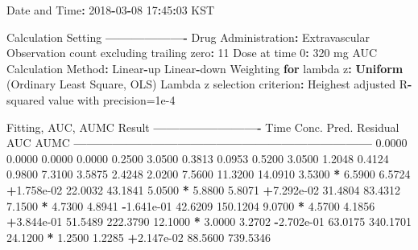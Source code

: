 \documentclass[12pt,]{krantz}
\newenvironment{Shaded}{\begin{snugshade}}{\end{snugshade}}
\newcommand{\KeywordTok}[1]{\textcolor[rgb]{0.13,0.29,0.53}{\textbf{#1}}}
\newcommand{\DecValTok}[1]{\textcolor[rgb]{0.00,0.00,0.81}{#1}}
\newcommand{\FloatTok}[1]{\textcolor[rgb]{0.00,0.00,0.81}{#1}}
\newcommand{\StringTok}[1]{\textcolor[rgb]{0.31,0.60,0.02}{#1}}
\newcommand{\ControlFlowTok}[1]{\textcolor[rgb]{0.13,0.29,0.53}{\textbf{#1}}}
\newcommand{\OperatorTok}[1]{\textcolor[rgb]{0.81,0.36,0.00}{\textbf{#1}}}
\newcommand{\NormalTok}[1]{#1}
\theoremstyle{definition}
\theoremstyle{definition}
\theoremstyle{definition}
\theoremstyle{remark}
\begin{document}
\begin{Shaded}
\begin{Highlighting}[]
{{{{{{{{\NormalTok{Date and Time}\OperatorTok{:}\StringTok{ }\DecValTok{2018}\OperatorTok{-}\DecValTok{03}\OperatorTok{-}\DecValTok{08} \DecValTok{17}\OperatorTok{:}\DecValTok{45}\OperatorTok{:}\DecValTok{03}\NormalTok{ KST}

\NormalTok{Calculation Setting}
\OperatorTok{-------------------}
\NormalTok{Drug Administration}\OperatorTok{:}\StringTok{ }\NormalTok{Extravascular}
\NormalTok{Observation count excluding trailing zero}\OperatorTok{:}\StringTok{ }\DecValTok{11}
\NormalTok{Dose at time }\DecValTok{0}\OperatorTok{:}\StringTok{ }\DecValTok{320}\NormalTok{ mg}
\NormalTok{AUC Calculation Method}\OperatorTok{:}\StringTok{ }\NormalTok{Linear}\OperatorTok{-}\NormalTok{up Linear}\OperatorTok{-}\NormalTok{down}
\NormalTok{Weighting }\ControlFlowTok{for}\NormalTok{ lambda z}\OperatorTok{:}\StringTok{ }\KeywordTok{Uniform}\NormalTok{ (Ordinary Least Square, OLS)}
\NormalTok{Lambda z selection criterion}\OperatorTok{:}\StringTok{ }\NormalTok{Heighest adjusted R}\OperatorTok{-}\NormalTok{squared value with precision=}\FloatTok{1e-4}


\NormalTok{Fitting, AUC, AUMC Result}
\OperatorTok{-------------------------}
\StringTok{      }\NormalTok{Time         Conc.      Pred.   Residual       AUC       AUMC}
\OperatorTok{---------------------------------------------------------------------}
\StringTok{     }\FloatTok{0.0000}       \FloatTok{0.0000}                           \FloatTok{0.0000}     \FloatTok{0.0000}
     \FloatTok{0.2500}       \FloatTok{3.0500}                           \FloatTok{0.3813}     \FloatTok{0.0953}
     \FloatTok{0.5200}       \FloatTok{3.0500}                           \FloatTok{1.2048}     \FloatTok{0.4124}
     \FloatTok{0.9800}       \FloatTok{7.3100}                           \FloatTok{3.5875}     \FloatTok{2.4248}
     \FloatTok{2.0200}       \FloatTok{7.5600}                          \FloatTok{11.3200}    \FloatTok{14.0910}
     \FloatTok{3.5300} \OperatorTok{*}\StringTok{     }\FloatTok{6.5900}     \FloatTok{6.5724} \OperatorTok{+}\FloatTok{1.758e-02}    \FloatTok{22.0032}    \FloatTok{43.1841}
     \FloatTok{5.0500} \OperatorTok{*}\StringTok{     }\FloatTok{5.8800}     \FloatTok{5.8071} \OperatorTok{+}\FloatTok{7.292e-02}    \FloatTok{31.4804}    \FloatTok{83.4312}
     \FloatTok{7.1500} \OperatorTok{*}\StringTok{     }\FloatTok{4.7300}     \FloatTok{4.8941} \OperatorTok{-}\FloatTok{1.641e-01}    \FloatTok{42.6209}   \FloatTok{150.1204}
     \FloatTok{9.0700} \OperatorTok{*}\StringTok{     }\FloatTok{4.5700}     \FloatTok{4.1856} \OperatorTok{+}\FloatTok{3.844e-01}    \FloatTok{51.5489}   \FloatTok{222.3790}
    \FloatTok{12.1000} \OperatorTok{*}\StringTok{     }\FloatTok{3.0000}     \FloatTok{3.2702} \OperatorTok{-}\FloatTok{2.702e-01}    \FloatTok{63.0175}   \FloatTok{340.1701}
    \FloatTok{24.1200} \OperatorTok{*}\StringTok{     }\FloatTok{1.2500}     \FloatTok{1.2285} \OperatorTok{+}\FloatTok{2.147e-02}    \FloatTok{88.5600}   \FloatTok{739.5346}

}}}}}}}}
\end{Highlighting}
\end{Shaded}
\end{document}
